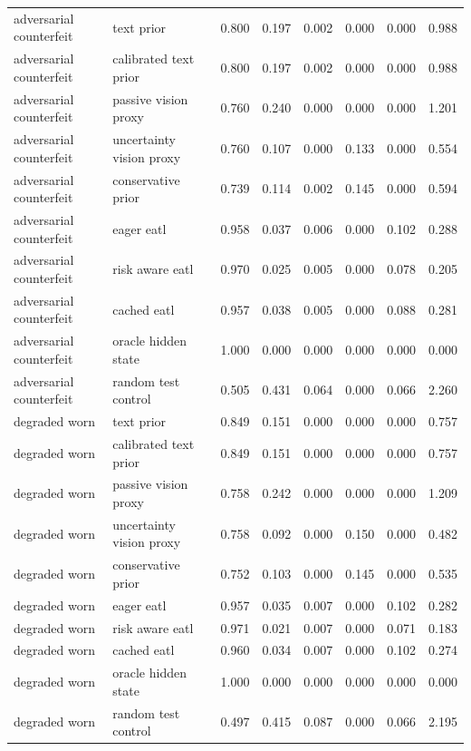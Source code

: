 \begin{longtable}{llrrrrrr}
\midrule
adversarial counterfeit & text prior & 0.800 & 0.197 & 0.002 & 0.000 & 0.000 & 0.988 \\
adversarial counterfeit & calibrated text prior & 0.800 & 0.197 & 0.002 & 0.000 & 0.000 & 0.988 \\
adversarial counterfeit & passive vision proxy & 0.760 & 0.240 & 0.000 & 0.000 & 0.000 & 1.201 \\
adversarial counterfeit & uncertainty vision proxy & 0.760 & 0.107 & 0.000 & 0.133 & 0.000 & 0.554 \\
adversarial counterfeit & conservative prior & 0.739 & 0.114 & 0.002 & 0.145 & 0.000 & 0.594 \\
adversarial counterfeit & eager eatl & 0.958 & 0.037 & 0.006 & 0.000 & 0.102 & 0.288 \\
adversarial counterfeit & risk aware eatl & 0.970 & 0.025 & 0.005 & 0.000 & 0.078 & 0.205 \\
adversarial counterfeit & cached eatl & 0.957 & 0.038 & 0.005 & 0.000 & 0.088 & 0.281 \\
adversarial counterfeit & oracle hidden state & 1.000 & 0.000 & 0.000 & 0.000 & 0.000 & 0.000 \\
adversarial counterfeit & random test control & 0.505 & 0.431 & 0.064 & 0.000 & 0.066 & 2.260 \\
\midrule
degraded worn & text prior & 0.849 & 0.151 & 0.000 & 0.000 & 0.000 & 0.757 \\
degraded worn & calibrated text prior & 0.849 & 0.151 & 0.000 & 0.000 & 0.000 & 0.757 \\
degraded worn & passive vision proxy & 0.758 & 0.242 & 0.000 & 0.000 & 0.000 & 1.209 \\
degraded worn & uncertainty vision proxy & 0.758 & 0.092 & 0.000 & 0.150 & 0.000 & 0.482 \\
degraded worn & conservative prior & 0.752 & 0.103 & 0.000 & 0.145 & 0.000 & 0.535 \\
degraded worn & eager eatl & 0.957 & 0.035 & 0.007 & 0.000 & 0.102 & 0.282 \\
degraded worn & risk aware eatl & 0.971 & 0.021 & 0.007 & 0.000 & 0.071 & 0.183 \\
degraded worn & cached eatl & 0.960 & 0.034 & 0.007 & 0.000 & 0.102 & 0.274 \\
degraded worn & oracle hidden state & 1.000 & 0.000 & 0.000 & 0.000 & 0.000 & 0.000 \\
degraded worn & random test control & 0.497 & 0.415 & 0.087 & 0.000 & 0.066 & 2.195 \\

\end{longtable}
